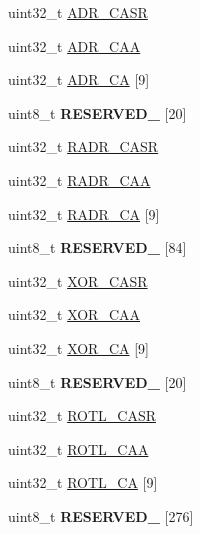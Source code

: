 \begin{DoxyCompactItemize}
\item 
uint32\+\_\+t \hyperlink{struct_c_a_u___mem_map_a064a59c5835525e09b7ce745abf8ba50}{A\+D\+R\+\_\+\+C\+A\+S\+R}
\item 
uint32\+\_\+t \hyperlink{struct_c_a_u___mem_map_a453c3f0527c3c433b9c4b47e2e1f5c91}{A\+D\+R\+\_\+\+C\+A\+A}
\item 
uint32\+\_\+t \hyperlink{struct_c_a_u___mem_map_af599c211258a0c20323c3f482368fa05}{A\+D\+R\+\_\+\+C\+A} \mbox{[}9\mbox{]}
\item 
\hypertarget{struct_c_a_u___mem_map_a918ab9ef5255b48f4b9f6c17305a48a5}{}uint8\+\_\+t {\bfseries R\+E\+S\+E\+R\+V\+E\+D\+\_} \mbox{[}20\mbox{]}\label{struct_c_a_u___mem_map_a918ab9ef5255b48f4b9f6c17305a48a5}

\item 
uint32\+\_\+t \hyperlink{struct_c_a_u___mem_map_a9d411dd17e1bf0560d6a9537650a39b9}{R\+A\+D\+R\+\_\+\+C\+A\+S\+R}
\item 
uint32\+\_\+t \hyperlink{struct_c_a_u___mem_map_a46c90a6c642fc19fe7a572b46b746761}{R\+A\+D\+R\+\_\+\+C\+A\+A}
\item 
uint32\+\_\+t \hyperlink{struct_c_a_u___mem_map_a9c1999a6a31be1422acd1d33f67f2a9e}{R\+A\+D\+R\+\_\+\+C\+A} \mbox{[}9\mbox{]}
\item 
\hypertarget{struct_c_a_u___mem_map_a7f0b9228cade0d5d64087f1e7b3a51ba}{}uint8\+\_\+t {\bfseries R\+E\+S\+E\+R\+V\+E\+D\+\_} \mbox{[}84\mbox{]}\label{struct_c_a_u___mem_map_a7f0b9228cade0d5d64087f1e7b3a51ba}

\item 
uint32\+\_\+t \hyperlink{struct_c_a_u___mem_map_a9a390a748c987c883432ae79087640e2}{X\+O\+R\+\_\+\+C\+A\+S\+R}
\item 
uint32\+\_\+t \hyperlink{struct_c_a_u___mem_map_a5597e40ecdc9aaf07f342eea55467ff1}{X\+O\+R\+\_\+\+C\+A\+A}
\item 
uint32\+\_\+t \hyperlink{struct_c_a_u___mem_map_acb520a0239533ff35af926264fd9a6a9}{X\+O\+R\+\_\+\+C\+A} \mbox{[}9\mbox{]}
\item 
\hypertarget{struct_c_a_u___mem_map_affe15ce8bc6244a816b1999c6dd2d036}{}uint8\+\_\+t {\bfseries R\+E\+S\+E\+R\+V\+E\+D\+\_} \mbox{[}20\mbox{]}\label{struct_c_a_u___mem_map_affe15ce8bc6244a816b1999c6dd2d036}

\item 
uint32\+\_\+t \hyperlink{struct_c_a_u___mem_map_a32dbbd85f3b4630c96083416bf2a8255}{R\+O\+T\+L\+\_\+\+C\+A\+S\+R}
\item 
uint32\+\_\+t \hyperlink{struct_c_a_u___mem_map_a512db0326bf0cfd6896ddb5ee85d76ee}{R\+O\+T\+L\+\_\+\+C\+A\+A}
\item 
uint32\+\_\+t \hyperlink{struct_c_a_u___mem_map_a2048933dd371b9c4145810ace598ce8f}{R\+O\+T\+L\+\_\+\+C\+A} \mbox{[}9\mbox{]}
\item 
\hypertarget{struct_c_a_u___mem_map_aad39743ff2366fbcf19c94b6e559ae85}{}uint8\+\_\+t {\bfseries R\+E\+S\+E\+R\+V\+E\+D\+\_} \mbox{[}276\mbox{]}\label{struct_c_a_u___mem_map_aad39743ff2366fbcf19c94b6e559ae85}


\end{DoxyCompactItemize}
